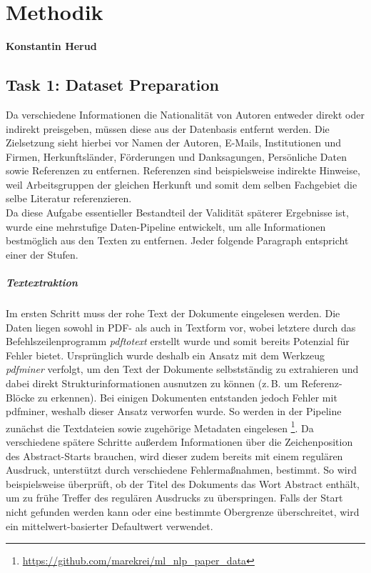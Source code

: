 \documentclass[bachelor,german]{info1thesis}
\begin{document}
\chapter{Methodik}
\textbf{Konstantin Herud} \\

\section{Task 1: Dataset Preparation}

Da verschiedene Informationen die Nationalität von Autoren entweder direkt oder indirekt preisgeben, müssen diese aus der Datenbasis entfernt werden. Die Zielsetzung sieht hierbei vor
Namen der Autoren,
E-Mails,
Institutionen und Firmen,
Herkunftsländer,
Förderungen und Danksagungen,
Persönliche Daten
sowie Referenzen
zu entfernen.
Referenzen sind beispielsweise indirekte Hinweise, weil Arbeitsgruppen der gleichen Herkunft und somit dem selben Fachgebiet die selbe Literatur referenzieren. \\
Da diese Aufgabe essentieller Bestandteil der Validität späterer Ergebnisse ist, wurde eine mehrstufige Daten-Pipeline entwickelt, um alle Informationen bestmöglich aus den Texten zu entfernen. Jeder folgende Paragraph entspricht einer der Stufen.

\paragraph{Textextraktion} Im ersten Schritt muss der rohe Text der Dokumente eingelesen werden. Die Daten liegen sowohl in PDF- als auch in Textform vor, wobei letztere durch das Befehlszeilenprogramm \textit{pdftotext} erstellt wurde und somit bereits Potenzial für Fehler bietet. Ursprünglich wurde deshalb ein Ansatz mit dem Werkzeug \textit{pdfminer} verfolgt, um den Text der Dokumente selbstständig zu extrahieren und dabei direkt Strukturinformationen ausnutzen zu können (z.\,B. um Referenz-Blöcke zu erkennen). Bei einigen Dokumenten entstanden jedoch Fehler mit pdfminer, weshalb dieser Ansatz verworfen wurde. So werden in der Pipeline zunächst die Textdateien sowie zugehörige Metadaten eingelesen \footnote{\url{https://github.com/marekrei/ml_nlp_paper_data}}. Da verschiedene spätere Schritte außerdem Informationen über die Zeichenposition des Abstract-Starts brauchen, wird dieser zudem bereits mit einem regulären Ausdruck, unterstützt durch verschiedene Fehlermaßnahmen, bestimmt. So wird beispielsweise überprüft, ob der Titel des Dokuments das Wort Abstract enthält, um zu frühe Treffer des regulären Ausdrucks zu überspringen. Falls der Start nicht gefunden werden kann oder eine bestimmte Obergrenze überschreitet, wird ein mittelwert-basierter Defaultwert verwendet.
\end{document}
